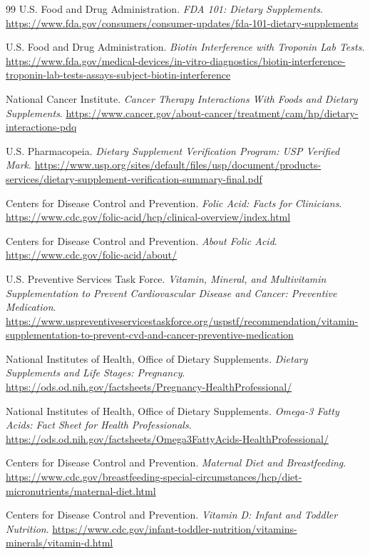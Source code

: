 \begin{thebibliography}{99}
 U.S. Food and Drug Administration. \emph{FDA 101: Dietary Supplements}. \url{https://www.fda.gov/consumers/consumer-updates/fda-101-dietary-supplements}

 U.S. Food and Drug Administration. \emph{Biotin Interference with Troponin Lab Tests}. \url{https://www.fda.gov/medical-devices/in-vitro-diagnostics/biotin-interference-troponin-lab-tests-assays-subject-biotin-interference}

 National Cancer Institute. \emph{Cancer Therapy Interactions With Foods and Dietary Supplements}. \url{https://www.cancer.gov/about-cancer/treatment/cam/hp/dietary-interactions-pdq}

 U.S. Pharmacopeia. \emph{Dietary Supplement Verification Program: USP Verified Mark}. \url{https://www.usp.org/sites/default/files/usp/document/products-services/dietary-supplement-verification-summary-final.pdf}

 Centers for Disease Control and Prevention. \emph{Folic Acid: Facts for Clinicians}. \url{https://www.cdc.gov/folic-acid/hcp/clinical-overview/index.html}

 Centers for Disease Control and Prevention. \emph{About Folic Acid}. \url{https://www.cdc.gov/folic-acid/about/}

 U.S. Preventive Services Task Force. \emph{Vitamin, Mineral, and Multivitamin Supplementation to Prevent Cardiovascular Disease and Cancer: Preventive Medication}. \url{https://www.uspreventiveservicestaskforce.org/uspstf/recommendation/vitamin-supplementation-to-prevent-cvd-and-cancer-preventive-medication}

 National Institutes of Health, Office of Dietary Supplements. \emph{Dietary Supplements and Life Stages: Pregnancy}. \url{https://ods.od.nih.gov/factsheets/Pregnancy-HealthProfessional/}

 National Institutes of Health, Office of Dietary Supplements. \emph{Omega-3 Fatty Acids: Fact Sheet for Health Professionals}. \url{https://ods.od.nih.gov/factsheets/Omega3FattyAcids-HealthProfessional/}

 Centers for Disease Control and Prevention. \emph{Maternal Diet and Breastfeeding}. \url{https://www.cdc.gov/breastfeeding-special-circumstances/hcp/diet-micronutrients/maternal-diet.html}

 Centers for Disease Control and Prevention. \emph{Vitamin D: Infant and Toddler Nutrition}. \url{https://www.cdc.gov/infant-toddler-nutrition/vitamins-minerals/vitamin-d.html}


\end{thebibliography}
